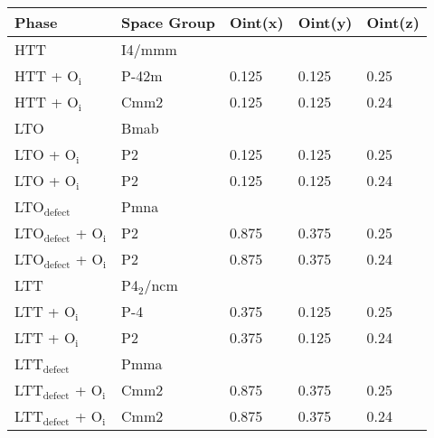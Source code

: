 \begin{tabular}{@{}lllll@{}}
\toprule
Phase                   & Space Group & Oint(x) & Oint(y) & Oint(z) \\ \midrule
HTT                     & I4/mmm      &         &         &         \\
HTT + O$_\text{i}$      & P-42m      & 0.125   & 0.125   & 0.25    \\
HTT + O$_\text{i}$      & Cmm2        & 0.125   & 0.125   & 0.24    \\
LTO                     & Bmab        &         &         &         \\
LTO + O$_\text{i}$      & P2          & 0.125   & 0.125   & 0.25    \\
LTO + O$_\text{i}$      & P2          & 0.125   & 0.125   & 0.24    \\
LTO$_\text{defect}$                & Pmna        &         &         &         \\
LTO$_\text{defect}$ + O$_\text{i}$ & P2          & 0.875   & 0.375   & 0.25    \\
LTO$_\text{defect}$ + O$_\text{i}$ & P2          & 0.875   & 0.375   & 0.24    \\
LTT                     & P4$_2$/ncm   &         &         &         \\
LTT + O$_\text{i}$      & P-4         & 0.375   & 0.125   & 0.25    \\
LTT + O$_\text{i}$      & P2          & 0.375   & 0.125   & 0.24    \\
LTT$_\text{defect}$               & Pmma        &         &         &         \\
LTT$_\text{defect}$ + O$_\text{i}$ & Cmm2        & 0.875   & 0.375   & 0.25    \\
LTT$_\text{defect}$ + O$_\text{i}$ & Cmm2        & 0.875   & 0.375   & 0.24    \\ \bottomrule
\end{tabular}
